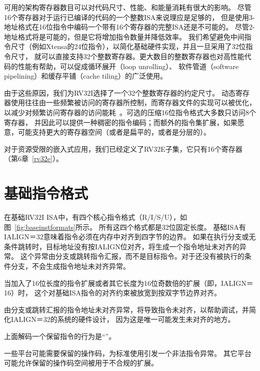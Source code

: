 \begin{commentary}
可用的架构寄存器数目可以对代码尺寸、性能、和能量消耗有很大的影响。
尽管16个寄存器对于运行已编译的代码的一个整数ISA来说理应是足够的，
但是使用3-地址格式在16位指令中编码一个带有16个寄存器的完整ISA还是不可能的。
尽管2-地址格式将是可能的，但是它将增加指令数量并降低效率。
我们希望避免中间指令尺寸（例如Xtensa的24位指令），以简化基础硬件实现，并且一旦采用了32位指令尺寸，
就可以直接支持32个整数寄存器。更大数目的整数寄存器也对高性能代码的性能有帮助，可以促成循环展开（loop unrolling）、
软件管道（software pipelining）和缓存平铺（cache tiling）的广泛使用。

由于这些原因，我们为RV32I选择了一个32个整数寄存器的约定尺寸。
动态寄存器使用往往由一些频繁被访问的寄存器所控制，而寄存器文件的实现可以被优化，
以减少对频繁访问寄存器的访问能耗~\cite{jtseng:sbbci}。可选的压缩16位指令格式大多数只访问8个寄存器，
并因此可以提供一种稠密的指令编码；而额外的指令集扩展，如果愿意，可能支持更大的寄存器空间（或者是扁平的，或者是分层的）。

对于资源受限的嵌入式应用，我们已经定义了RV32E子集，它只有16个寄存器（第6章~\ref{rv32e}）。
\end{commentary}

\section{基础指令格式}

在基础RV32I ISA中，有四个核心指令格式（R/I/S/U），如图~\ref{fig:baseinstformats}所示。
所有这四个格式都是32位固定长度。
基础ISA有IALIGN＝32意味着指令必须在内存中对齐到四字节的边界。
如果在执行分支或无条件跳转时，目标地址没有按IALIGN位对齐，将生成一个指令地址未对齐的异常。
这个异常由分支或跳转指令汇报，而不是目标指令。对于还没有被执行的条件分支，不会生成指令地址未对齐异常。

\begin{commentary}
当加入了16位长度的指令扩展或者其它长度为16位奇数倍的扩展（即，IALIGN＝16）时，
这个对基础ISA指令的对齐约束被放宽到按双字节边界对齐。

由分支或跳转汇报的指令地址未对齐异常，将导致指令未对齐，以帮助调试，并简化IALIGN＝32的系统的硬件设计，
因为这是唯一可能发生未对齐的地方。
\end{commentary}

上面解码一个保留指令的行为是“\unspecified”。
\begin{commentary}
一些平台可能需要保留的操作码，为标准使用引发一个非法指令异常。
其它平台可能允许保留的操作码空间被用于不合规的扩展。
\end{commentary}

